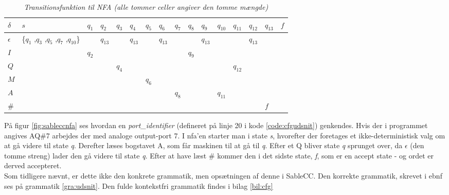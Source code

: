 \begin{table}[H]
\centering
\footnotesize
{}
\begin{tabular}{l@{\hskip\tabcolsep\vrule width 1pt\hskip\tabcolsep}m{5em}|l|l|l|l|l|l|l|l|l|l|l|l|l|l}

$\delta$         & $s$              & $q_{1}$ & $q_{2}$ & $q_{3}$ & $q_{4}$ & $q_{5}$ & $q_{6}$ & $q_{7}$ & $q_{8}$ & $q_{9}$ & $q_{10}$ & $q_{11}$ & $q_{12}$ & $q_{13}$ & $f$ \\ \bottomrule
$\epsilon$ & \{$q_{1}$ ,$q_{3}$ ,$q_{5}$ ,$q_{7}$ ,$q_{10}$\} &   & $q_{13}$ &   & $q_{13}$ &   & $q_{13}$ &   &   & $q_{13}$ &    &    & $q_{13}$ &    &   \\ 
$I$          &                & $q_{2}$ &    &   &    &   &    &   & $q_{9}$ &    &    &    &    &    &   \\ 
$Q$          &                &   &    & $q_{4}$ &    &   &    &   &   &    &    & $q_{12}$ &    &    &   \\ 
$M$          &                &   &    &   &    & $q_{6}$ &    &   &   &    &    &    &    &    &   \\
$A$          &                &   &    &   &    &   &    & $q_{8}$ &   &    & $q_{11}$ &    &    &    &   \\ 
\#         &                &   &    &   &    &   &    &   &   &    &    &    &    & $f$  &   \\
\end{tabular}
	\caption{\textit{Transitionsfunktion til NFA (alle tommer celler angiver den tomme mængde)}}
    \label{tab:nfadelta}
\end{table}

\noindent På figur \ref{fig:sableccnfa} ses hvordan en \textit{port\_identifier} (defineret på linje 20 i kode \ref{code:cfgudsnit}) genkendes. Hvis der i programmet angives AQ\#7 arbejdes der med analoge output-port 7. I \gls{nfa}'en starter man i state \textit{s}, hvorefter der foretages et ikke-deterministisk valg om at gå videre til state  \textit{q}. Derefter læses bogstavet A, som får maskinen til at gå til \textit{q}. Efter et Q bliver state \textit{q} sprunget over, da $\epsilon$ (den tomme streng) lader den gå videre til state \textit{q}. Efter at have læst \# kommer den i det sidste state, \textit{f}, som er en accept state - og ordet er derved accepteret. \\

\noindent Som tidligere nævnt, er dette ikke den konkrete grammatik, men opsætningen af denne i SableCC. Den korrekte grammatik, skrevet i \gls{ebnf} ses på grammatik \ref{gra:udsnit}. Den fulde kontekstfri grammatik findes i bilag \ref{bil:cfg}

